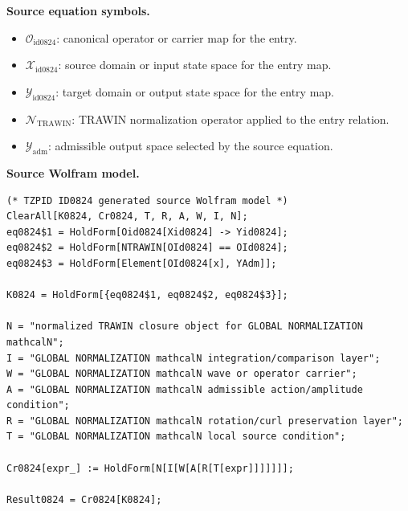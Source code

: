 \begin{minipage}[t]{0.49\linewidth}
\begingroup
\small
\raggedright
\textbf{Source equation symbols.}\par
\begin{itemize}[leftmargin=1.35em,itemsep=1pt,topsep=1pt,parsep=0pt]
    \item $\mathcal{O}_{\mathrm{id0824}}$: canonical operator or carrier map for the entry.
    \item $\mathcal{X}_{\mathrm{id0824}}$: source domain or input state space for the entry map.
    \item $\mathcal{Y}_{\mathrm{id0824}}$: target domain or output state space for the entry map.
    \item $\mathcal{N}_{\mathrm{TRAWIN}}$: TRAWIN normalization operator applied to the entry relation.
    \item $\mathcal{Y}_{\mathrm{adm}}$: admissible output space selected by the source equation.
\end{itemize}
\endgroup
\end{minipage}\hfill
\begin{minipage}[t]{0.47\linewidth}
\begingroup
\scriptsize
\raggedright
\textbf{Source Wolfram model.}\par
\begin{Verbatim}[fontsize=\tiny,breaklines=true,breakanywhere=true]
(* TZPID ID0824 generated source Wolfram model *)
ClearAll[K0824, Cr0824, T, R, A, W, I, N];
eq0824$1 = HoldForm[Oid0824[Xid0824] -> Yid0824];
eq0824$2 = HoldForm[NTRAWIN[OId0824] == OId0824];
eq0824$3 = HoldForm[Element[OId0824[x], YAdm]];

K0824 = HoldForm[{eq0824$1, eq0824$2, eq0824$3}];

N = "normalized TRAWIN closure object for GLOBAL NORMALIZATION mathcalN";
I = "GLOBAL NORMALIZATION mathcalN integration/comparison layer";
W = "GLOBAL NORMALIZATION mathcalN wave or operator carrier";
A = "GLOBAL NORMALIZATION mathcalN admissible action/amplitude condition";
R = "GLOBAL NORMALIZATION mathcalN rotation/curl preservation layer";
T = "GLOBAL NORMALIZATION mathcalN local source condition";

Cr0824[expr_] := HoldForm[N[I[W[A[R[T[expr]]]]]]];

Result0824 = Cr0824[K0824];
\end{Verbatim}
\endgroup
\end{minipage}

